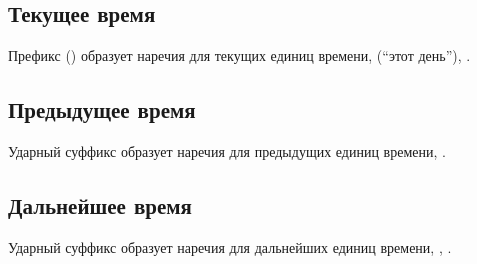 \subsection{Текущее время} Префикс 
() образует наречия для текущих единиц времени,   (``этот день''),  . 

\subsection{Предыдущее время} Ударный суффикс  образует наречия для предыдущих единиц времени,  
 .

\subsection{Дальнейшее время} Ударный суффикс  образует наречия для дальнейших единиц времени,  , 
 .
